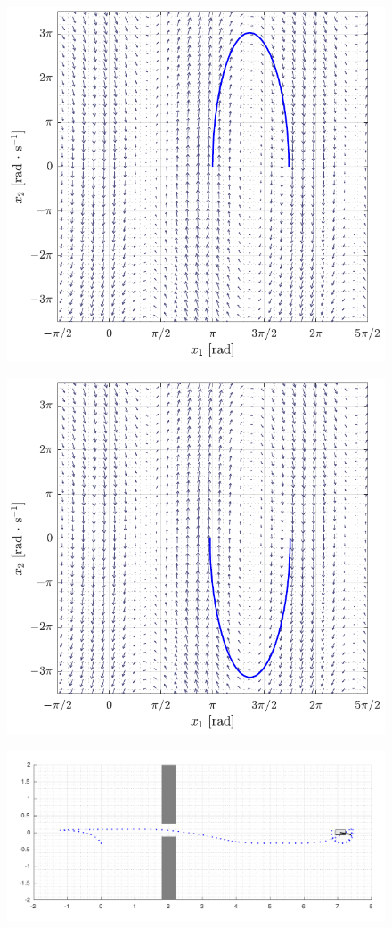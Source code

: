 \begin{figure}[H]\vspace{-2cm}
  \includegraphics[width=.8\textwidth]{figures/firstTraj}
\end{figure}
\begin{figure}[H]\vspace{-.5cm}
\includegraphics[width=.8\textwidth]{figures/thirdTraj}
\end{figure}


\begin{figure}
  \begin{minipage}{.9\textwidth}
    \hspace{-1.8cm}
      \includegraphics[width=1.35\textwidth]{figures/trajectoryAnimation}
  \end{minipage}
\end{figure}

